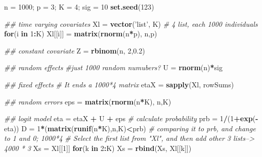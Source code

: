 \documentclass[]{book}
\newenvironment{Shaded}{\begin{snugshade}}{\end{snugshade}}
\newcommand{\CommentTok}[1]{\textcolor[rgb]{0.56,0.35,0.01}{\textit{#1}}}
\newcommand{\ControlFlowTok}[1]{\textcolor[rgb]{0.13,0.29,0.53}{\textbf{#1}}}
\newcommand{\DecValTok}[1]{\textcolor[rgb]{0.00,0.00,0.81}{#1}}
\newcommand{\FloatTok}[1]{\textcolor[rgb]{0.00,0.00,0.81}{#1}}
\newcommand{\KeywordTok}[1]{\textcolor[rgb]{0.13,0.29,0.53}{\textbf{#1}}}
\newcommand{\NormalTok}[1]{#1}
\newcommand{\OperatorTok}[1]{\textcolor[rgb]{0.81,0.36,0.00}{\textbf{#1}}}
\newcommand{\StringTok}[1]{\textcolor[rgb]{0.31,0.60,0.02}{#1}}
\begin{document}
\begin{Shaded}
\begin{Highlighting}[]
\NormalTok{n =}\StringTok{ }\DecValTok{1000}\NormalTok{; p =}\StringTok{ }\DecValTok{3}\NormalTok{; K =}\StringTok{ }\DecValTok{4}\NormalTok{; sig =}\StringTok{ }\DecValTok{10}
\KeywordTok{set.seed}\NormalTok{(}\DecValTok{123}\NormalTok{)}

\CommentTok{## time varying covariates}
\NormalTok{Xl =}\StringTok{ }\KeywordTok{vector}\NormalTok{(}\StringTok{'list'}\NormalTok{, K)}
\CommentTok{# 4 list, each 1000 individuals}
\ControlFlowTok{for}\NormalTok{(i }\ControlFlowTok{in} \DecValTok{1}\OperatorTok{:}\NormalTok{K) Xl[[i]] =}\StringTok{ }\KeywordTok{matrix}\NormalTok{(}\KeywordTok{rnorm}\NormalTok{(n}\OperatorTok{*}\NormalTok{p), n,p)}

\CommentTok{## constant covariate}
\NormalTok{Z =}\StringTok{ }\KeywordTok{rbinom}\NormalTok{(n, }\DecValTok{2}\NormalTok{,}\FloatTok{0.2}\NormalTok{)}

\CommentTok{## random effects}
\CommentTok{#just 1000 random numubers?}
\NormalTok{U =}\StringTok{ }\KeywordTok{rnorm}\NormalTok{(n)}\OperatorTok{*}\NormalTok{sig}

\CommentTok{## fixed effects}
\CommentTok{# It ends a 1000*4 matrix}
\NormalTok{etaX =}\StringTok{ }\KeywordTok{sapply}\NormalTok{(Xl, rowSums)}

\CommentTok{## random errors}
\NormalTok{eps =}\StringTok{ }\KeywordTok{matrix}\NormalTok{(}\KeywordTok{rnorm}\NormalTok{(n}\OperatorTok{*}\NormalTok{K), n,K)}

\CommentTok{## logit model}
\NormalTok{eta =}\StringTok{ }\NormalTok{etaX }\OperatorTok{+}\StringTok{ }\NormalTok{U }\OperatorTok{+}\StringTok{ }\NormalTok{eps}
\CommentTok{# calculate probability}
\NormalTok{prb =}\StringTok{ }\DecValTok{1}\OperatorTok{/}\NormalTok{(}\DecValTok{1}\OperatorTok{+}\KeywordTok{exp}\NormalTok{(}\OperatorTok{-}\NormalTok{eta))}
\NormalTok{D =}\StringTok{ }\DecValTok{1}\OperatorTok{*}\NormalTok{(}\KeywordTok{matrix}\NormalTok{(}\KeywordTok{runif}\NormalTok{(n}\OperatorTok{*}\NormalTok{K),n,K)}\OperatorTok{<}\NormalTok{prb) }\CommentTok{# comparing it to prb, and change to 1 and 0; 1000*4}
\CommentTok{# Select the first list from "Xl", and then add other 3 lists--> 4000 * 3}
\NormalTok{Xs =}\StringTok{ }\NormalTok{Xl[[}\DecValTok{1}\NormalTok{]]}
\ControlFlowTok{for}\NormalTok{(k }\ControlFlowTok{in} \DecValTok{2}\OperatorTok{:}\NormalTok{K) Xs =}\StringTok{ }\KeywordTok{rbind}\NormalTok{(Xs, Xl[[k]])}


\end{Highlighting}
\end{Shaded}
\end{document}
